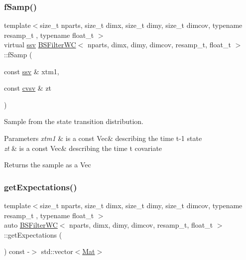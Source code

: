 \subsubsection{\texorpdfstring{f\+Samp()}{fSamp()}}
{\footnotesize\ttfamily template$<$size\+\_\+t nparts, size\+\_\+t dimx, size\+\_\+t dimy, size\+\_\+t dimcov, typename resamp\+\_\+t , typename float\+\_\+t $>$ \\
virtual \hyperlink{classBSFilterWC_afff292a8cc15505cc3aa244135203c78}{ssv} \hyperlink{classBSFilterWC}{B\+S\+Filter\+WC}$<$ nparts, dimx, dimy, dimcov, resamp\+\_\+t, float\+\_\+t $>$\+::f\+Samp (\begin{DoxyParamCaption}\item[{const \hyperlink{classBSFilterWC_afff292a8cc15505cc3aa244135203c78}{ssv} \&}]{xtm1,  }\item[{const \hyperlink{classBSFilterWC_a52f5a46901a821fffe82937543220a1a}{cvsv} \&}]{zt }\end{DoxyParamCaption})\hspace{0.3cm}{\ttfamily [pure virtual]}}



Sample from the state transition distribution. 


\begin{DoxyParams}{Parameters}
{\em xtm1} & is a const Vec\& describing the time t-\/1 state \\
\hline
{\em zt} & is a const Vec\& describing the time t covariate \\
\hline
\end{DoxyParams}
\begin{DoxyReturn}{Returns}
the sample as a Vec 
\end{DoxyReturn}
\mbox{\label{classBSFilterWC_abbac1ed7a57f04ec34d389e3ac822a90}} 
\subsubsection{\texorpdfstring{get\+Expectations()}{getExpectations()}}
{\footnotesize\ttfamily template$<$size\+\_\+t nparts, size\+\_\+t dimx, size\+\_\+t dimy, size\+\_\+t dimcov, typename resamp\+\_\+t , typename float\+\_\+t $>$ \\
auto \hyperlink{classBSFilterWC}{B\+S\+Filter\+WC}$<$ nparts, dimx, dimy, dimcov, resamp\+\_\+t, float\+\_\+t $>$\+::get\+Expectations (\begin{DoxyParamCaption}{ }\end{DoxyParamCaption}) const -\/$>$ std\+::vector$<$\hyperlink{classBSFilterWC_a507a06203a27e3a025a43be68b4b0e0e}{Mat}$>$}



